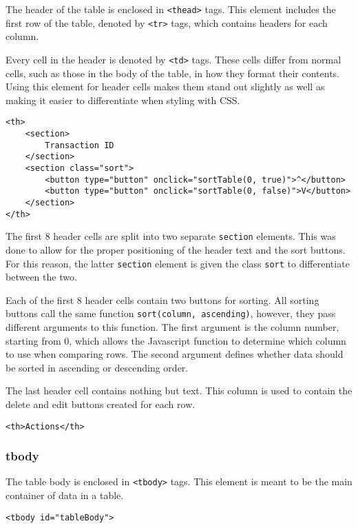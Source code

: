 \documentclass[letterpaper]{article}
\begin{document}
The header of the table is enclosed in \lstinline{<thead>} tags.
This element includes the first row of the table, denoted by \lstinline{<tr>} tags, which contains headers for each column.

Every cell in the header is denoted by \lstinline{<td>} tags.
These cells differ from normal cells, such as those in the body of the table, in how they format their contents.
Using this element for header cells makes them stand out slightly as well as making it easier to differentiate when styling with CSS.

\begin{lstlisting}[firstnumber=61]
<th>
    <section>
        Transaction ID
    </section>
    <section class="sort">
        <button type="button" onclick="sortTable(0, true)">^</button>
        <button type="button" onclick="sortTable(0, false)">V</button>
    </section>
</th>
\end{lstlisting}

The first 8 header cells are split into two separate \lstinline{section} elements.
This was done to allow for the proper positioning of the header text and the sort buttons.
For this reason, the latter \lstinline{section} element is given the class \lstinline{sort} to differentiate between the two.

Each of the first 8 header cells contain two buttons for sorting.
All sorting buttons call the same function \lstinline{sort(column, ascending)}, however, they pass different arguments to this function.
The first argument is the column number, starting from 0, which allows the Javascript function to determine which column to use when comparing rows.
The second argument defines whether data should be sorted in ascending or descending order.

The last header cell contains nothing but text.
This column is used to contain the delete and edit buttons created for each row.

\begin{lstlisting}[firstnumber=133]
<th>Actions</th>
\end{lstlisting}

\subsubsection{tbody}

The table body is enclosed in \lstinline{<tbody>} tags.
This element is meant to be the main container of data in a table.

\begin{lstlisting}[firstnumber=136]
<tbody id="tableBody">
\end{lstlisting}
\end{document}
